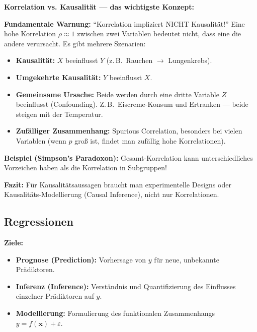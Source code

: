 \textbf{Korrelation vs. Kausalität — das wichtigste Konzept:}

\textbf{Fundamentale Warnung:} ``Korrelation impliziert NICHT Kausalität!'' Eine hohe Korrelation $\rho \approx 1$ zwischen zwei Variablen bedeutet nicht, dass eine die andere verursacht. Es gibt mehrere Szenarien:

\begin{itemize}[leftmargin=1.5em]
    \item \textbf{Kausalität:} $X$ beeinflusst $Y$ (z.\,B.\ Rauchen $\to$ Lungenkrebs).
    \item \textbf{Umgekehrte Kausalität:} $Y$ beeinflusst $X$.
    \item \textbf{Gemeinsame Ursache:} Beide werden durch eine dritte Variable $Z$ beeinflusst (Confounding). Z.\,B.\ Eiscreme-Konsum und Ertranken — beide steigen mit der Temperatur.
    \item \textbf{Zufälliger Zusammenhang:} Spurious Correlation, besonders bei vielen Variablen (wenn $p$ groß ist, findet man zufällig hohe Korrelationen).
\end{itemize}

\textbf{Beispiel (Simpson's Paradoxon):} Gesamt-Korrelation kann unterschiedliches Vorzeichen haben als die Korrelation in Subgruppen!

\textbf{Fazit:} Für Kausalitätsaussagen braucht man experimentelle Designs oder Kausalitäts-Modellierung (Causal Inference), nicht nur Korrelationen.

\newpage

\subsection{Regressionen}


\textbf{Ziele:}
\begin{itemize}[leftmargin=1.5em]
    \item \textbf{Prognose (Prediction):} Vorhersage von $y$ für neue, unbekannte Prädiktoren.
    \item \textbf{Inferenz (Inference):} Verständnis und Quantifizierung des Einflusses einzelner Prädiktoren auf $y$.
    \item \textbf{Modellierung:} Formulierung des funktionalen Zusammenhangs $y = f(\mathbf{x}) + \varepsilon$.
\end{itemize}

